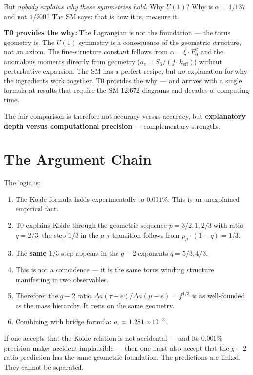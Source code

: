 But \textit{nobody explains why these symmetries hold}. Why $U(1)$? Why is $\alpha = 1/137$ and not $1/200$? The SM says: that is how it is, measure it.

\textbf{T0 provides the why:} The Lagrangian is not the foundation --- the torus geometry is. The $U(1)$ symmetry is a consequence of the geometric structure, not an axiom. The fine-structure constant follows from $\alpha = \xi \cdot E_0^2$ and the anomalous moments directly from geometry ($a_e = S_3/(f \cdot k_\text{eff})$) without perturbative expansion. The SM has a perfect recipe, but no explanation for why the ingredients work together. T0 provides the why --- and arrives with a single formula at results that require the SM 12,672 diagrams and decades of computing time.

The fair comparison is therefore not accuracy versus accuracy, but \textbf{explanatory depth versus computational precision} --- complementary strengths.

\section{The Argument Chain}

The logic is:
\begin{enumerate}
	\item The Koide formula holds experimentally to $0.001\%$. This is an unexplained empirical fact.
	\item T0 explains Koide through the geometric sequence $p = 3/2, 1, 2/3$ with ratio $q = 2/3$; the step $1/3$ in the $\mu$-$\tau$ transition follows from $p_\mu \cdot (1-q) = 1/3$.
	\item The \textbf{same} $1/3$ step appears in the $g-2$ exponents $q = 5/3, 4/3$.
	\item This is not a coincidence --- it is the same torus winding structure manifesting in two observables.
	\item Therefore: the $g-2$ ratio $\Delta a(\tau{-}e)/\Delta a(\mu{-}e) = f^{1/3}$ is as well-founded as the mass hierarchy. It rests on the same geometry.
	\item Combining with bridge formula: $a_\tau \approx 1.281 \times 10^{-3}$.
\end{enumerate}

If one accepts that the Koide relation is not accidental --- and its $0.001\%$ precision makes accident implausible --- then one must also accept that the $g-2$ ratio prediction has the same geometric foundation. The predictions are linked. They cannot be separated.


